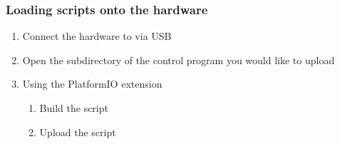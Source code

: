 \subsubsection{Loading scripts onto the hardware}
\begin{enumerate}
    \item Connect the hardware to via USB
    \item Open the subdirectory of the control program you would like to upload
    \item Using the PlatformIO extension
    \begin{enumerate}
        \item Build the script
        \item Upload the script 
    \end{enumerate}
\end{enumerate}

\clearpage